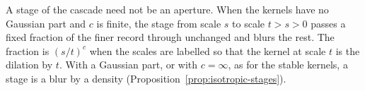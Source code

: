 A stage of the cascade need not be an aperture. When the kernels have no Gaussian
part and $c$ is finite, the stage from scale $s$ to scale $t > s > 0$ passes a fixed fraction
of the finer record through unchanged and blurs the rest. The fraction is $(s/t)^c$ when the
scales are labelled so that the kernel at scale $t$ is the dilation by $t$. With a Gaussian
part, or with $c = \infty$, as for the stable kernels, a stage is a blur by a density
(Proposition~\ref{prop:isotropic-stages}).

